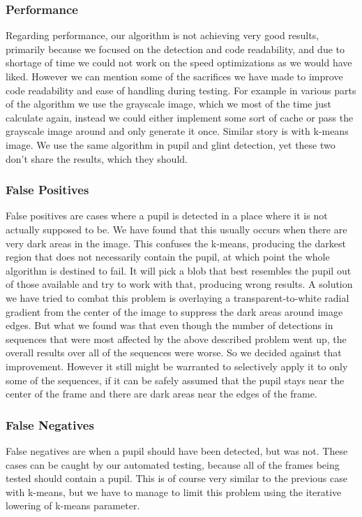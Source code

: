 \subsubsection{Performance}
Regarding performance, our algorithm is not achieving very good results, primarily because we focused on the detection and code readability, and due to shortage of time we could not work on the speed optimizations as we would have liked. However we can mention some of the sacrifices we have made to improve code readability and ease of handling during testing. 
For example in various parts of the algorithm we use the grayscale image, which we most of the time just calculate again, instead we could either implement some sort of cache or pass the grayscale image around and only generate it once. Similar story is with k-means image. We use the same algorithm in pupil and glint detection, yet these two don't share the results, which they should.

\subsubsection{False Positives}
False positives are cases where a pupil is detected in a place where it is not actually supposed to be. We have found that this usually occurs when there are very dark areas in the image. This confuses the k-means, producing the darkest region that does not necessarily contain the pupil, at which point the whole algorithm is destined to fail. It will pick a blob that best resembles the pupil out of those available and try to work with that, producing wrong results. 
A solution we have tried to combat this problem is overlaying a transparent-to-white radial gradient from the center of the image to suppress the dark areas around image edges. But what we found was that even though the number of detections in sequences that were most affected by the above described problem went up, the overall results over all of the sequences were worse. So we decided against that improvement. However it still might be warranted to selectively apply it to only some of the sequences, if it can be safely assumed that the pupil stays near the center of the frame and there are dark areas near the edges of the frame.

\subsubsection{False Negatives}
False negatives are when a pupil should have been detected, but was not. These cases can be caught by our automated testing, because all of the frames being tested should contain a pupil. This is of course very similar to the previous case with k-means, but we have to manage to limit this problem using the iterative lowering of k-means parameter.
